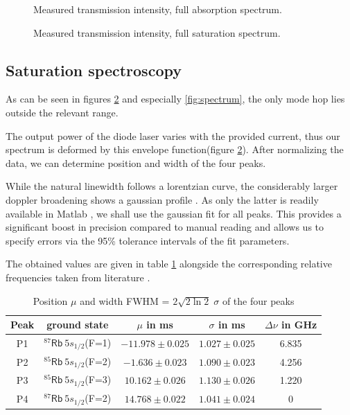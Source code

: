 \begin{figure}[p]
	\centering
	
	\vspace{-2em}
	\caption{Measured transmission intensity, full absorption spectrum.}
	\label{fig:absorption}
	\vspace{-1em}
\end{figure}

\begin{figure}[p]
	\centering
	
	\vspace{-2em}
	\caption{Measured transmission intensity, full saturation spectrum.}
	\label{fig:saturation}
\end{figure}

\newpage
\subsection{Saturation spectroscopy}
As can be seen in figures \ref{fig:saturation} and especially \ref{fig:spectrum}, the only mode hop lies outside the relevant range.

The output power of the diode laser varies with the provided current, thus our spectrum is deformed by this envelope function(figure \ref{fig:saturation}). After normalizing the data, we can determine position and width of the four peaks.

While the natural linewidth follows a lorentzian curve, the considerably larger doppler broadening shows a gaussian profile \cite{lit:SAS}. As only the latter is readily available in Matlab \cite{lit:fittypes}, we shall use the gaussian fit for all peaks. This provides a significant boost in precision compared to manual reading and allows us to specify errors via the 95\% tolerance intervals of the fit parameters.

The obtained values are given in table \ref{tab:raw} alongside the corresponding relative frequencies taken from literature \cite{lit:Rb85, lit:Rb87}.

\begin{table}[h]
 \centering
 \caption{Position $\mu$ and width FWHM = $2 \sqrt{2 \ln 2} \; \sigma$ of the four peaks}
 \label{tab:raw}
 \begin{tabular}{ccccc}
  \toprule
  Peak	& ground state 	& $\mu$ in ms 		& $\sigma$ in ms 		& $\Delta \nu$ in GHz	\\
  \midrule
  P1		& $^{87}\mathsf{Rb}~5s_{1/2}$(F=1)	& $-11.978 \pm 0.025$	& $1.027 \pm 0.025$ 	& 6.835		\\
  P2		& $^{85}\mathsf{Rb}~5s_{1/2}$(F=2)	& $-1.636 \pm 0.023$	& $1.090 \pm 0.023$ 	& 4.256		\\
  P3		& $^{85}\mathsf{Rb}~5s_{1/2}$(F=3)	& $10.162 \pm 0.026$	& $1.130 \pm 0.026$ 	& 1.220		\\
  P4		& $^{87}\mathsf{Rb}~5s_{1/2}$(F=2)	& $14.768 \pm 0.022$	& $1.041 \pm 0.024$ 	& 0			\\
  \bottomrule
 \end{tabular}
\end{table}

